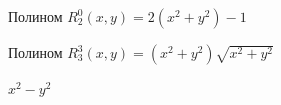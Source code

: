 \documentclass[oneside, final, 14pt]{article}
\begin{document}
\begin{figure}
\caption{Полином $R_2^0(x,y) = 2(x^2 + y^2) - 1$}
\end{figure}
\begin{figure}
\caption{Полином $R_3^3(x,y) = (x^2 + y^2)\sqrt{x^2 + y^2}$}
\end{figure}
\begin{figure}
\caption{$x^2 - y^2$}
\end{figure}
\newpage
\end{document}
